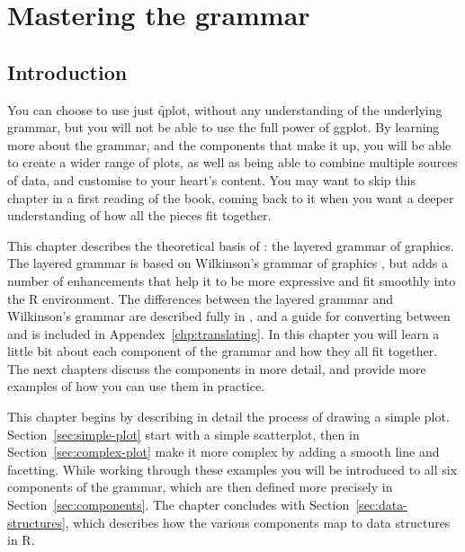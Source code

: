 

% 


\chapter{Mastering the grammar}
\label{cha:mastery}

\section{Introduction}

You can choose to use just \f{qplot}, without any understanding of the underlying grammar, but you will not be able to use the full power of ggplot.  By learning more about the grammar, and the components that make it up, you will be able to create a wider range of plots, as well as being able to combine multiple sources of data, and customise to your heart's content.  You may want to skip this chapter in a first reading of the book, coming back to it when you want a deeper understanding of how all the pieces fit together.

This chapter describes the theoretical basis of \ggplot: the layered grammar of graphics.  The layered grammar is based on Wilkinson's grammar of graphics \citep{wilkinson:2006}, but adds a number of enhancements that help it to be more expressive and fit smoothly into the R environment.  The differences between the layered grammar and Wilkinson's grammar are described fully in \citep{wickham:2008}, and a guide for converting between  and \ggplot is included in Appendex~\ref{chp:translating}.  In this chapter you will learn a little bit about each component of the grammar and how they all fit together.  The next chapters discuss the components in more detail, and provide more examples of how you can use them in practice.

This chapter begins by describing in detail the process of drawing a simple plot.  Section~\ref{sec:simple-plot} start with a simple scatterplot, then in Section~\ref{sec:complex-plot} make it more complex by adding a smooth line and facetting.  While working through these examples you will be introduced to all six components of the grammar, which are then defined more precisely in Section~\ref{sec:components}.  The chapter concludes with Section~\ref{sec:data-structures}, which describes how the various components map to data structures in R.  

